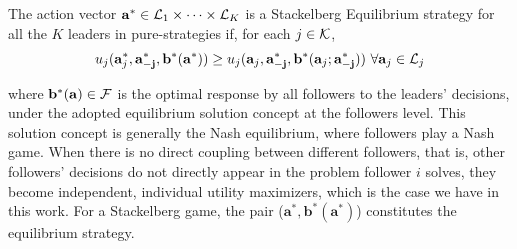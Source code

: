 \begin{definition}The action vector $\mathbf{a^*} \in {\cal L}_1\times\dots\times{\cal L}_K$ is a Stackelberg Equilibrium strategy for all the $K$ leaders in pure-strategies if, for each $ j \in {\cal K}$,
\begin{eqnarray}u_j({\bf{a}}^*_j,\mathbf{a^*_{-j}},\mathbf{b^*(a^*)}) \geq u_j({\bf{a}}_j,\mathbf{a^*_{-j}},\mathbf{b^*}({\bf{a}}_j;{\bf{a^*_{-j}}}))\ \forall {\bf{a}}_j\in\scr{L}_j \label{SE}\end{eqnarray}
\end{definition}
where $\mathbf{b^*(a)} \in {\cal F}$ is the optimal response by all followers to the leaders' decisions, under the adopted equilibrium solution concept at the followers level. {\color{black} This solution concept is generally the Nash equilibrium, where followers play a Nash game. When there is no direct coupling between different followers, that is, other followers' decisions do not directly appear in the problem follower $i$ solves, they become independent, individual utility maximizers, which is the case we have in this work.} For a Stackelberg game, the pair ($\mathbf{a^*,b^*(a^*)}$) constitutes the equilibrium strategy. 

